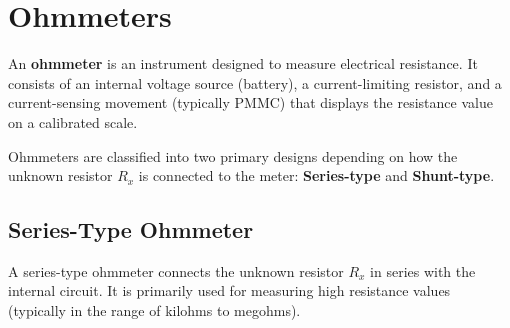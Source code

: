 \documentclass[12pt,a4paper]{article}
\begin{document}
\section{Ohmmeters}

\begin{tcolorbox}[defbox, title={\textbf{Ohmmeter}}]
An \textbf{ohmmeter} is an instrument designed to measure electrical resistance. It consists of an internal voltage source (battery), a current-limiting resistor, and a current-sensing movement (typically PMMC) that displays the resistance value on a calibrated scale.
\end{tcolorbox}

Ohmmeters are classified into two primary designs depending on how the unknown resistor $R_x$ is connected to the meter: \textbf{Series-type} and \textbf{Shunt-type}.

\subsection{Series-Type Ohmmeter}
A series-type ohmmeter connects the unknown resistor $R_x$ in series with the internal circuit. It is primarily used for measuring high resistance values (typically in the range of kilohms to megohms).
\end{document}
